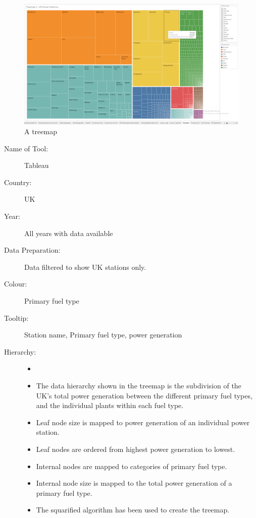 \documentclass{article}
\begin{document}
\begin{figure}[ht]
\centering
\includegraphics[scale=0.3]{Treemap.PNG}
\caption{A treemap}
\end{figure}

\begin{description}
\item[Name of Tool:]
Tableau
\item[Country:]
UK
\item[Year:]
All years with data available
\item[Data Preparation:]
Data filtered to show UK stations only.
\item[Colour:]
Primary fuel type
\item[Tooltip:]
Station name, Primary fuel type, power generation


\item[Hierarchy:]

\begin{itemize}
    \item[]
    \item The data hierarchy shown in the treemap is the subdivision of the UK's total power generation between the different primary fuel types, and the individual plants within each fuel type.
    \item Leaf node size is mapped to power generation of an individual power station.
    \item Leaf nodes are ordered from highest power generation to lowest.
    \item Internal nodes are mapped to categories of primary fuel type.
    \item Internal node size is mapped to the total power generation of a primary fuel type. 
    \item The squarified algorithm has been used to create the treemap. 
\end{itemize} 
\end{description}
\end{document}
